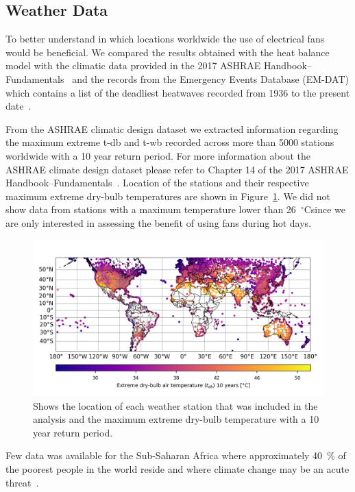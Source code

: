 \subsection{Weather Data}\label{subsec:weather-data}

To better understand in which locations worldwide the use of electrical fans would be beneficial. 
We compared the results obtained with the heat balance model with the climatic data provided in the 2017 ASHRAE Handbook--Fundamentals~\cite{ASHRA2017} and the records from the Emergency Events Database (EM-DAT) which contains a list of the deadliest heatwaves recorded from 1936 to the present date~\cite{EMDATThe70:online}.

From the ASHRAE climatic design dataset we extracted information regarding the maximum extreme \ac{t-db} and \ac{t-wb} recorded across more than 5000 stations worldwide with a 10 year return period.
For more information about the ASHRAE climate design dataset please refer to Chapter 14 of the 2017 ASHRAE Handbook--Fundamentals~\cite{ASHRA2017}.
Location of the stations and their respective maximum extreme dry-bulb temperatures are shown in Figure~\ref{fig:world-map}.
We did not show data from stations with a maximum temperature lower than 26~$^\circ$C\@ since we are only interested in assessing the benefit of using fans during hot days.

\begin{figure}[thb!]
    \centering
    \includegraphics[width=\textwidth]{figures/world-map.png}
    \caption{Shows the location of each weather station that was included in the analysis and the maximum extreme dry-bulb temperature with a 10 year return period.}
    \label{fig:world-map}
\end{figure}

Few data was available for the Sub-Saharan Africa where approximately 40~\% of the poorest people in the world reside and where climate change may be an acute threat~\cite{PovertyO1:online}.

